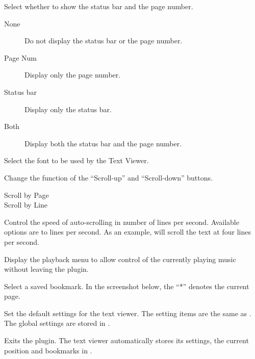 \begin{description}
\begin{description}
{    \item[Show Footer] Select whether to show the status bar and the page number.
        \begin{description}
            \item[None] Do not display the status bar or the page number.
            \item[Page Num] Display only the page number.
            \item[Status bar] Display only the status bar.
            \item[Both] Display both the status bar and the page number.
        \end{description}

    \item[Font] Select the font to be used by the Text Viewer.
    }
    \item[Scroll Mode] Change the function of the ``Scroll-up'' and
    ``Scroll-down'' buttons.
        \begin{description}
            \item[Scroll by Page]
            \item[Scroll by Line]
        \end{description}
    \item[Auto-scroll Speed] Control the speed of auto-scrolling in number
      of lines per second.  Available options are  to
       lines per second. As an example,
       will scroll the text at four lines per second.
    \end{description}

\item[Show Playback Menu] Display the playback menu to allow control of the
currently playing music without leaving the plugin.

\item[Select Bookmark] Select a saved bookmark. In the screenshot below, the
``*'' denotes the current page.


\item[Global Settings] Set the default settings for the text viewer.
The setting items are the same as . The global
settings are stored in
.

\item[Quit] Exits the plugin. The text viewer automatically
stores its settings, the current position and bookmarks in
.
\end{description}


